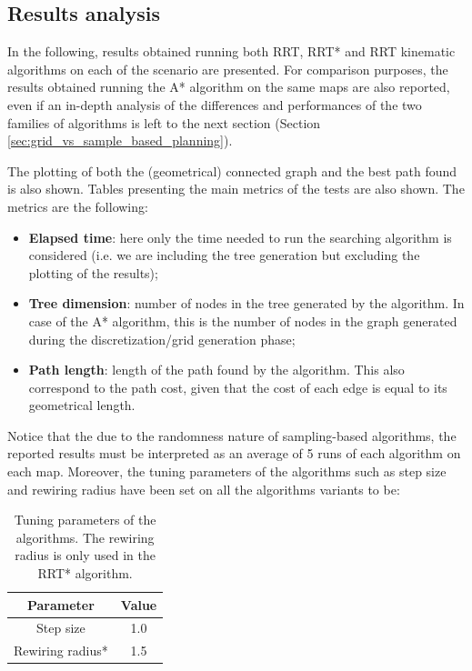 \subsection{Results analysis}
\label{subsec:results_analysis}

In the following, results obtained running both RRT, RRT* and RRT kinematic algorithms on each of the scenario are presented.
For comparison purposes, the results obtained running the A* algorithm on the same maps are also reported, even if an in-depth analysis of the differences and performances of the two families of algorithms is left to the next section (Section \ref{sec:grid_vs_sample_based_planning}).

The plotting of both the (geometrical) connected graph and the best path found is also shown.
Tables presenting the main metrics of the tests are also shown.
The metrics are the following:

\begin{itemize}
    \item \textbf{Elapsed time}: here only the time needed to run the searching algorithm is considered (i.e. we are including the tree generation but excluding the plotting of the results);
    \item \textbf{Tree dimension}: number of nodes in the tree generated by the algorithm. In case of the A* algorithm, this is the number of nodes in the graph generated during the discretization/grid generation phase;
    \item \textbf{Path length}: length of the path found by the algorithm. This also correspond to the path cost, given that the cost of each edge is equal to its geometrical length.
\end{itemize}

Notice that the due to the randomness nature of sampling-based algorithms, the reported results must be interpreted as an average of 5 runs of each algorithm on each map.
Moreover, the tuning parameters of the algorithms such as step size and rewiring radius have been set on all the algorithms variants to be:

\begin{table}[H]
    \centering
    \begin{tabular}{|c|c|}
        \hline
        \textbf{Parameter} & \textbf{Value} \\
        \hline
        Step size          & 1.0            \\
        Rewiring radius*   & 1.5            \\
        \hline
    \end{tabular}
    \caption{Tuning parameters of the algorithms. The rewiring radius is only used in the RRT* algorithm.}
    \label{tab:algorithm_parameters}
\end{table}

